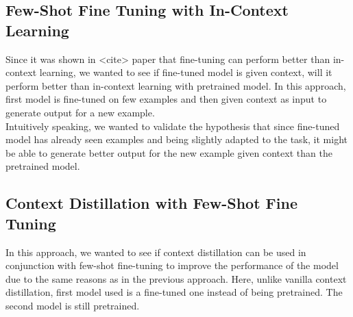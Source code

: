 \documentclass[10pt,twocolumn,letterpaper]{article}
\begin{document}
\subsection{Few-Shot Fine Tuning with In-Context Learning}
Since it was shown in <cite> paper that fine-tuning can perform better than in-context learning, we wanted to see if fine-tuned model is given context,
will it perform better than in-context learning with pretrained model.
In this approach, first model is fine-tuned on few examples and then given context as input to generate output for a new example.\\
Intuitively speaking, we wanted to validate the hypothesis that since fine-tuned model has already seen examples and being slightly adapted to the task, it might be able to generate better output
for the new example given context than the pretrained model.

\subsection{Context Distillation with Few-Shot Fine Tuning}
In this approach, we wanted to see if context distillation can be used in conjunction with few-shot fine-tuning to improve the performance of the model due to the same reasons as
in the previous approach. Here, unlike vanilla context distillation, first model used is a fine-tuned one instead of being pretrained. The second model is still pretrained.
\end{document}
